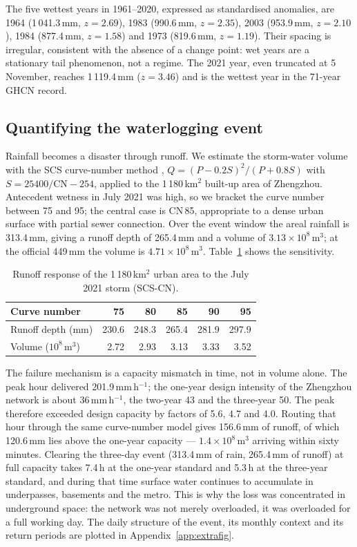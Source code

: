 The five wettest years in 1961--2020, expressed as standardised anomalies, are 1964 (1\,041.3\,mm, $z=2.69$), 1983 (990.6\,mm, $z=2.35$), 2003 (953.9\,mm, $z=2.10$), 1984 (877.4\,mm, $z=1.58$) and 1973 (819.6\,mm, $z=1.19$). Their spacing is irregular, consistent with the absence of a change point: wet years are a stationary tail phenomenon, not a regime. The 2021 year, even truncated at 5 November, reaches 1\,119.4\,mm ($z=3.46$) and is the wettest year in the 71-year GHCN record.

\subsection{Quantifying the waterlogging event}

Rainfall becomes a disaster through runoff. We estimate the storm-water volume with the SCS curve-number method \cite{neh1986}, $Q=(P-0.2S)^2/(P+0.8S)$ with $S=25400/\mathrm{CN}-254$, applied to the 1\,180\,km$^2$ built-up area of Zhengzhou. Antecedent wetness in July 2021 was high, so we bracket the curve number between 75 and 95; the central case is CN\,85, appropriate to a dense urban surface with partial sewer connection. Over the event window the areal rainfall is 313.4\,mm, giving a runoff depth of 265.4\,mm and a volume of $3.13\times10^{8}$\,m$^3$; at the official 449\,mm the volume is $4.71\times10^{8}$\,m$^3$. Table~\ref{tab:cn} shows the sensitivity.

\begin{table}[H]
\centering
\caption{Runoff response of the 1\,180\,km$^2$ urban area to the July 2021 storm (SCS-CN).}
\label{tab:cn}
\small
\begin{tabular}{lrrrrr}
\toprule
Curve number & 75 & 80 & 85 & 90 & 95\\
\midrule
Runoff depth (mm) & 230.6 & 248.3 & 265.4 & 281.9 & 297.9\\
Volume ($10^{8}$\,m$^3$) & 2.72 & 2.93 & 3.13 & 3.33 & 3.52\\
\bottomrule
\end{tabular}
\end{table}

The failure mechanism is a capacity mismatch in time, not in volume alone. The peak hour delivered 201.9\,mm\,h$^{-1}$; the one-year design intensity of the Zhengzhou network is about 36\,mm\,h$^{-1}$, the two-year 43 and the three-year 50. The peak therefore exceeded design capacity by factors of 5.6, 4.7 and 4.0. Routing that hour through the same curve-number model gives 156.6\,mm of runoff, of which 120.6\,mm lies above the one-year capacity --- $1.4\times10^{8}$\,m$^3$ arriving within sixty minutes. Clearing the three-day event (313.4\,mm of rain, 265.4\,mm of runoff) at full capacity takes 7.4\,h at the one-year standard and 5.3\,h at the three-year standard, and during that time surface water continues to accumulate in underpasses, basements and the metro. This is why the loss was concentrated in underground space: the network was not merely overloaded, it was overloaded for a full working day. The daily structure of the event, its monthly context and its return periods are plotted in Appendix~\ref{app:extrafig}.
